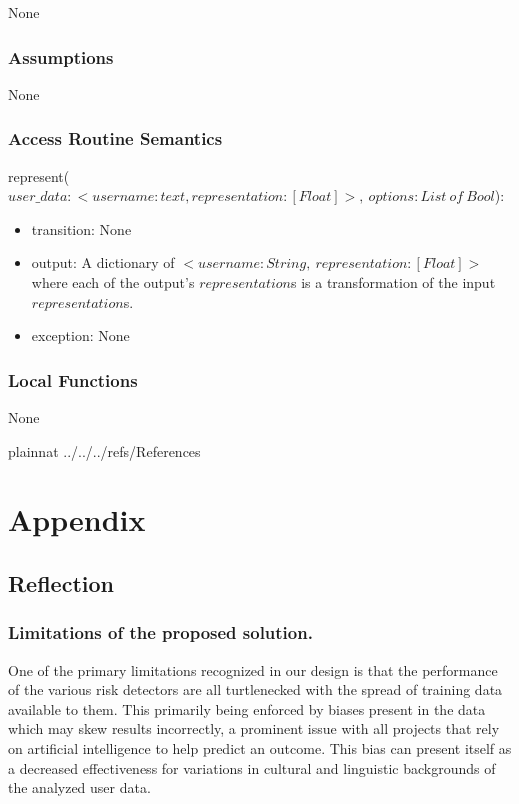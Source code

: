 \documentclass[12pt, titlepage]{article}
\begin{document}
None

\subsubsection{Assumptions}

None

\subsubsection{Access Routine Semantics}

\noindent represent($user\_data: <username: text, representation: [Float]>,\ options: List\ of\ Bool$):
\begin{itemize}
\item transition: None
\item output: A dictionary of $<username: String,\ representation: [Float]>$ where each of the output's $representation$s is a transformation of the input $representation$s.
\item exception: None
\end{itemize}

\subsubsection{Local Functions}

None

\newpage

 {plainnat}
 {../../../refs/References}

\newpage    

\section{Appendix} \label{Appendix}
\subsection{Reflection}

\subsubsection{Limitations of the proposed solution.}
One of the primary limitations recognized in our design is that the performance of the various risk detectors are all turtlenecked with the spread of training data available to them. This primarily being enforced by biases present in the data which may skew results incorrectly, a prominent issue with all projects that rely on artificial intelligence to help predict an outcome. This bias can present itself as a decreased effectiveness for variations in cultural and linguistic backgrounds of the analyzed user data.
\end{document}
